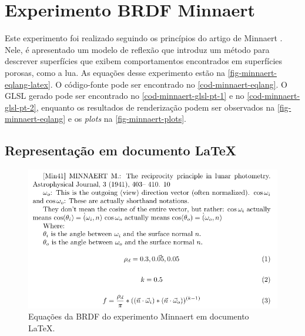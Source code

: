 \section{Experimento BRDF Minnaert}
\label{section-experiment-minnaert}

Este experimento foi realizado seguindo os princípios do artigo de Minnaert \cite{minnaert1941reciprocity}. Nele, é apresentado um modelo de reflexão que introduz um método para descrever superfícies que exibem comportamentos encontrados em superfícies porosas, como a lua. As equações desse experimento estão na \autoref{fig-minnaert-eqlang-latex}. O código-fonte pode ser encontrado no \autoref{cod-minnaert-eqlang}. O GLSL gerado pode ser encontrado no \autoref{cod-minnaert-glsl-pt-1} e no \autoref{cod-minnaert-glsl-pt-2}, enquanto os resultados de renderização podem ser observados na \autoref{fig-minnaert-eqlang} e os \textit{plots} na \autoref{fig-minnaert-plots}.


\subsection{Representação em documento \LaTeX{}}
\begin{figure}[H]
    \caption{\label{fig-minnaert-eqlang-latex} \small Equações da BRDF do experimento Minnaert em documento \LaTeX{}.}
    \begin{center}
        \includegraphics[scale=0.92]{./Imagens/brdfs/minnaert.pdf}
    \end{center}
\end{figure}

